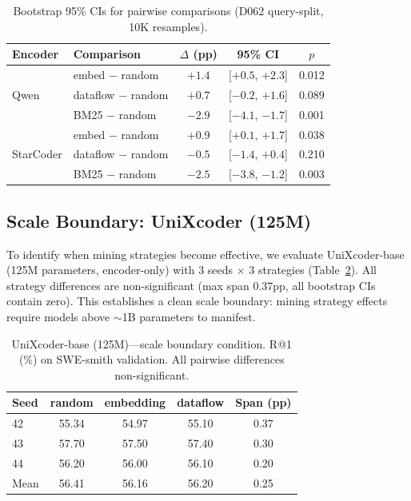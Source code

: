 \documentclass[11pt,a4paper]{article}
\begin{document}
\begin{table}[t]
\centering
\small
\caption{Bootstrap 95\% CIs for pairwise comparisons (D062 query-split, 10K resamples).}
\label{tab:bootstrap}
\begin{tabular}{llccc}
\toprule
Encoder & Comparison & $\Delta$ (pp) & 95\% CI & $p$ \\
\midrule
\multirow{3}{*}{Qwen} & embed $-$ random & $+1.4$ & [$+0.5$, $+2.3$] & 0.012 \\
& dataflow $-$ random & $+0.7$ & [$-0.2$, $+1.6$] & 0.089 \\
& BM25 $-$ random & $-2.9$ & [$-4.1$, $-1.7$] & 0.001 \\
\midrule
\multirow{3}{*}{StarCoder} & embed $-$ random & $+0.9$ & [$+0.1$, $+1.7$] & 0.038 \\
& dataflow $-$ random & $-0.5$ & [$-1.4$, $+0.4$] & 0.210 \\
& BM25 $-$ random & $-2.5$ & [$-3.8$, $-1.2$] & 0.003 \\
\bottomrule
\end{tabular}
\end{table}

\subsection{Scale Boundary: UniXcoder (125M)}
\label{sec:unixcoder}

To identify when mining strategies become effective, we evaluate UniXcoder-base (125M parameters, encoder-only) with 3 seeds $\times$ 3 strategies (Table~\ref{tab:unixcoder}). All strategy differences are non-significant (max span 0.37pp, all bootstrap CIs contain zero). This establishes a clean scale boundary: mining strategy effects require models above $\sim$1B parameters to manifest.

\begin{table}[t]
\centering
\small
\caption{UniXcoder-base (125M)---scale boundary condition. R@1 (\%) on SWE-smith validation. All pairwise differences non-significant.}
\label{tab:unixcoder}
\begin{tabular}{lcccc}
\toprule
Seed & random & embedding & dataflow & Span (pp) \\
\midrule
42 & 55.34 & 54.97 & 55.10 & 0.37 \\
43 & 57.70 & 57.50 & 57.40 & 0.30 \\
44 & 56.20 & 56.00 & 56.10 & 0.20 \\
\midrule
Mean & 56.41 & 56.16 & 56.20 & 0.25 \\
\bottomrule
\end{tabular}
\end{table}
\end{document}
